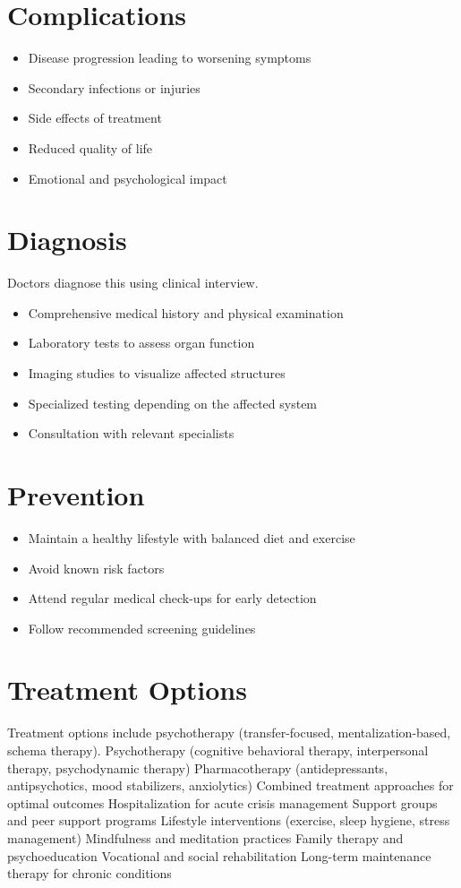 \section{Complications}
\begin{itemize}[noitemsep]
  \item Disease progression leading to worsening symptoms
  \item Secondary infections or injuries
  \item Side effects of treatment
  \item Reduced quality of life
  \item Emotional and psychological impact
\end{itemize}
\section{Diagnosis}
Doctors diagnose this using clinical interview.

\begin{itemize}[noitemsep]
  \item Comprehensive medical history and physical examination
  \item Laboratory tests to assess organ function
  \item Imaging studies to visualize affected structures
  \item Specialized testing depending on the affected system
  \item Consultation with relevant specialists
\end{itemize}
\section{Prevention}
\begin{itemize}[noitemsep]
  \item Maintain a healthy lifestyle with balanced diet and exercise
  \item Avoid known risk factors
  \item Attend regular medical check-ups for early detection
  \item Follow recommended screening guidelines
\end{itemize}
\section{Treatment Options}
Treatment options include psychotherapy (transfer-focused, mentalization-based, schema therapy). Psychotherapy (cognitive behavioral therapy, interpersonal therapy, psychodynamic therapy) Pharmacotherapy (antidepressants, antipsychotics, mood stabilizers, anxiolytics) Combined treatment approaches for optimal outcomes Hospitalization for acute crisis management Support groups and peer support programs Lifestyle interventions (exercise, sleep hygiene, stress management) Mindfulness and meditation practices Family therapy and psychoeducation Vocational and social rehabilitation Long-term maintenance therapy for chronic conditions

